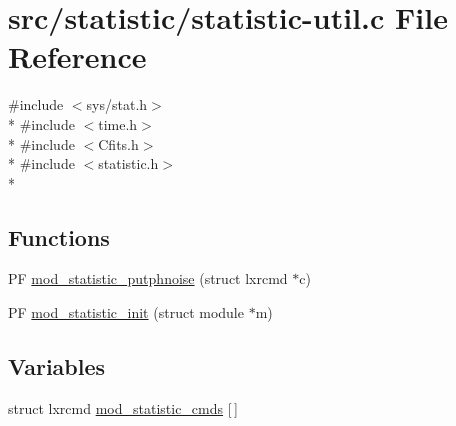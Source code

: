 \hypertarget{statistic-util_8c}{\section{src/statistic/statistic-\/util.c File Reference}
\label{statistic-util_8c}
}
{\ttfamily \#include $<$sys/stat.\+h$>$}\\*
{\ttfamily \#include $<$time.\+h$>$}\\*
{\ttfamily \#include $<$Cfits.\+h$>$}\\*
{\ttfamily \#include $<$statistic.\+h$>$}\\*
\subsection*{Functions}
\begin{DoxyCompactItemize}
\item 
P\+F \hyperlink{statistic-util_8c_adf68f86d319ba00ac620d3468420f5d4}{mod\+\_\+statistic\+\_\+putphnoise} (struct lxrcmd $\ast$c)
\item 
P\+F \hyperlink{statistic-util_8c_aedea1c5063287d3e0ce501bf630a3b05}{mod\+\_\+statistic\+\_\+init} (struct module $\ast$m)
\end{DoxyCompactItemize}
\subsection*{Variables}
\begin{DoxyCompactItemize}
\item 
struct lxrcmd \hyperlink{statistic-util_8c_a0adc435a6dca61c948182a0d8d2c9dc4}{mod\+\_\+statistic\+\_\+cmds} \mbox{[}$\,$\mbox{]}
\end{DoxyCompactItemize}


